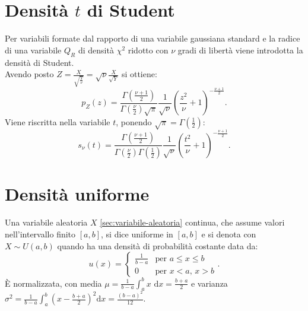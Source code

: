 \section{Densità $t$ di Student} %
\label{sec:student}
Per variabili formate dal rapporto di una variabile gaussiana standard e la radice di una variabile $Q_R$ di densità $\chi^2$ ridotto con $\nu$ gradi di libertà viene introdotta la densità di Student.
\\ Avendo posto $Z=\frac{X}{\sqrt{\frac{Y}{\nu}}}=\sqrt{\nu}\frac{X}{\sqrt{Y}}$ si ottiene:
\begin{equation}
p_{ Z }\left( z \right) =\frac { \Gamma \left( \frac { \nu +1 }{ 2 }  \right)  }{ \Gamma \left( \frac { \nu  }{ 2 }  \right) \sqrt { \pi  }  } \frac { 1 }{ \sqrt { \nu  }  } { \left( \frac { { z }^{ 2 } }{ \nu  } +1 \right)  }^{ -\frac { \nu +1 }{ 2 }  }.
\end{equation}
Viene riscritta nella variabile $t$, ponendo $\sqrt{\pi}=\Gamma(\frac{1}{2})$: 
\begin{equation}
\label{eq:student}
s_{ \nu  }\left( t \right) =\frac { \Gamma \left( \frac { \nu +1 }{ 2 }  \right)  }{ \Gamma \left( \frac { \nu  }{ 2 }  \right) \Gamma \left( \frac { 1 }{ 2 }  \right)  } \frac { 1 }{ \sqrt { \nu  }  } { \left( \frac { t^{ 2 } }{ \nu  } +1 \right)  }^{ -\frac { \nu +1 }{ 2 }  }.
\end{equation}

\section{Densità uniforme} %
\label{sec:uniforme}
Una variabile aleatoria $X$ \ref{sec:variabile-aleatoria} continua, che assume valori nell'intervallo finito $[a,b]$, si dice uniforme in $[a,b]$ e si denota con $X\sim U(a,b)$ quando ha una densità di probabilità costante data da:
\begin{equation}
\label{eq:uniforme}
u(x)=
\begin{cases}
\frac { 1 }{ b-a } & \textrm{per } a\le x\le b\\ 0 & \textrm{per } x<a \textrm{, } x>b
\end{cases}.
\end{equation}
\`E normalizzata, con media $\mu =\frac { 1 }{ b-a } \int _{ a }^{ b }{ x \textrm{ d}x= } \frac { b+a }{ 2 } $ e varianza ${ \sigma  }^{ 2 }=\frac { 1 }{ b-a } \int _{ a }^{ b }{ { \left( x-\frac { b+a }{ 2 }  \right)  }^{ 2 } \textrm{d}x=\frac { { \left( b-a \right)  }^{ 2 } }{ 12 }  } $.

